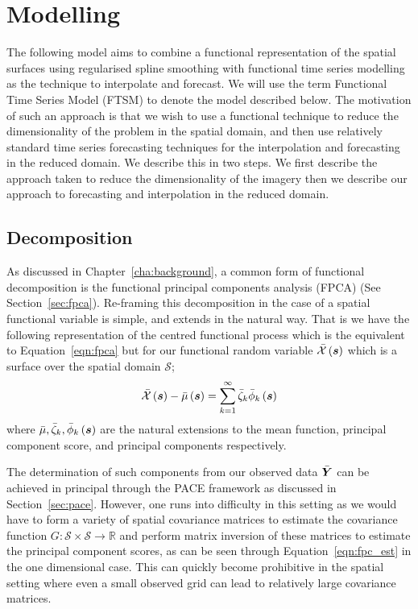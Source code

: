 \section{Modelling \label{sec:ftsm_model}}
The following model aims to combine a functional representation of the spatial surfaces using regularised spline smoothing with functional time series modelling as the technique to interpolate and forecast. We will use the term Functional Time Series Model (FTSM) to denote the model described below. 
The motivation of such an approach is that we wish to use a functional technique to reduce the dimensionality of the problem in the spatial domain, and then use relatively standard time series forecasting techniques for the interpolation and forecasting in the reduced domain.
We describe this in two steps.
We first describe the approach taken to reduce the dimensionality of the imagery then we describe our approach to forecasting and interpolation in the reduced domain.

\subsection{Decomposition}
As discussed in Chapter~\ref{cha:background}, a common form of functional decomposition is the functional principal components analysis (FPCA) (See Section~\ref{sec:fpca}).
Re-framing this decomposition in the case of a spatial functional variable is simple, and extends in the natural way.
That is we have the following representation of the centred functional process which is the equivalent to Equation~\eqref{eqn:fpca} but for our functional random variable $\bar{\mathcal{X}}\left(\bm{{s}}\right)$ which is a surface over the spatial domain $\mathcal{S}$;
\begin{equation}
	\bar{\mathcal{X}}\left(\bm{{s}}\right) -\bar{\mu}\left(\bm{{s}}\right) = \sum_{k=1}^{\infty} \bar{\zeta}_k \bar{\phi}_k \left( \bm{{s}} \right)
	\label{eqn:space_fpca}
\end{equation}
where $\bar{\mu}, \bar{\zeta}_k, \bar{\phi}_k\left(\bm{{s}}\right)$ are the natural extensions to the mean function, principal component score, and principal components respectively. 

The determination of such components from our observed data $\bar{\bm{{Y}}}$ can be achieved in principal through the PACE framework as discussed in Section~\ref{sec:pace}.
However, one runs into difficulty in this setting as we would have to form a variety of spatial covariance matrices to estimate the covariance function $G: \mathcal{S} \times \mathcal{S} \to \mathbb{R}$ and perform matrix inversion of these matrices to estimate the principal component scores, as can be seen through Equation~\eqref{eqn:fpc_est} in the one dimensional case.
This can quickly become prohibitive in the spatial setting where even a small observed grid can lead to relatively large covariance matrices. 

